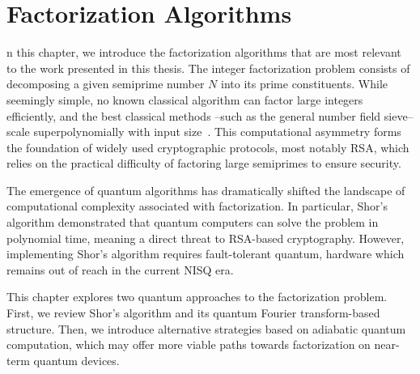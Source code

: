 \chapter{Factorization Algorithms}
\label{Chapter:Factorization}

n this chapter, we introduce the factorization algorithms that are most relevant
to the work presented in this thesis. The integer factorization problem consists of
decomposing a given semiprime number $N$ into its prime constituents. While seemingly simple,
no known classical algorithm can factor large integers efficiently, and the best classical
methods --such as the general number field sieve-- scale superpolynomially with input
size~\cite{montgomery_cwi_1994}. This computational asymmetry forms the foundation of widely
used cryptographic protocols, most notably RSA, which relies on the practical difficulty of
factoring large semiprimes to ensure security.

The emergence of quantum algorithms has dramatically shifted the landscape of computational
complexity associated with factorization. In particular, Shor's algorithm demonstrated that
quantum computers can solve the problem in polynomial time, meaning a direct threat to
RSA-based cryptography. However, implementing Shor's algorithm requires fault-tolerant quantum,
hardware which remains out of reach in the current NISQ era.


This chapter explores two quantum approaches to the factorization problem. First, we review
Shor's algorithm and its quantum Fourier transform-based structure. Then, we introduce
alternative strategies based on adiabatic quantum computation, which may offer more viable paths
towards factorization on near-term quantum devices.